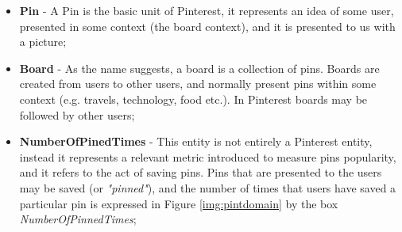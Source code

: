 \begin{itemize}
\item \textbf{Pin} - A Pin is the basic unit of Pinterest, it represents an idea of some user, presented in some context (the board context), and it is presented to us with a picture;
\item \textbf{Board} - As the name suggests, a board is a collection of pins. Boards are created from users to other users, and normally present pins within some context (e.g. travels, technology, food etc.). In Pinterest boards may be followed by other users;
\item \textbf{NumberOfPinedTimes} - This entity is not entirely a Pinterest entity, instead it represents a relevant metric introduced to measure pins popularity, and it refers to the act of saving pins. Pins that are presented to the users may be saved (or \textit{"pinned"}), and the number of times that users have saved a particular pin is expressed in Figure \ref{img:pintdomain} by the box \textit{NumberOfPinnedTimes};
\end{itemize}


